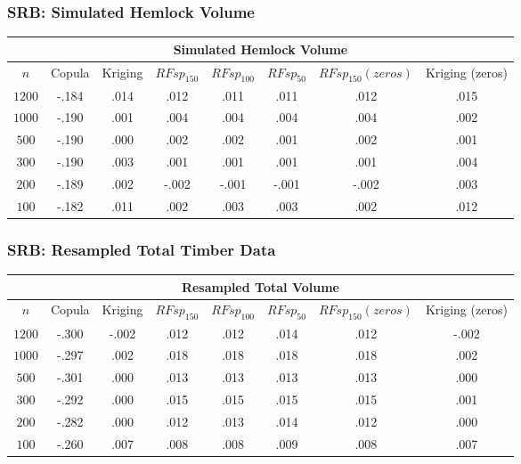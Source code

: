 \documentclass{beamer}
\begin{document}
\begin{frame}
	\frametitle{SRB: Simulated Hemlock Volume}
	\begin{center}
		\begin{tabular}{|| c | c c c c c c c ||}
		\hline
		\multicolumn{8}{||c||}{Simulated Hemlock Volume} \\
		\hline
		$n$ & Copula & Kriging & $RFsp_{150}$ & $RFsp_{100}$ & $RFsp_{50}$ & $RFsp_{150}(zeros)$ & Kriging (zeros) \\ [.5ex] 
		\hline\hline
		$1200$ & \cellcolor{gray}-.184 & .014 & .012 & \cellcolor{cyan}.011 & \cellcolor{cyan}.011 & .012 & .015 \\
		$1000$ & \cellcolor{gray}-.190 & \cellcolor{cyan}.001 & .004 & .004 & .004 & .004 & .002 \\
		$500$ & \cellcolor{gray}-.190 & \cellcolor{cyan}.000 & .002 & .002 & .001 & .002 & .001 \\
		$300$ & \cellcolor{gray}-.190 & .003 & \cellcolor{cyan}.001 & \cellcolor{cyan}.001 & \cellcolor{cyan}.001 & \cellcolor{cyan}.001 & .004 \\
		$200$ & \cellcolor{gray}-.189 & .002 & -.002 & \cellcolor{cyan}-.001 & \cellcolor{cyan}-.001 & -.002 & .003 \\
		$100$ & \cellcolor{gray}-.182 & .011 & \cellcolor{cyan}.002 & .003 & .003 & \cellcolor{cyan}.002 & .012 \\ [.5ex] 
		\hline
		\end{tabular}
	\end{center}
\end{frame}

\begin{frame}
	\frametitle{SRB: Resampled Total Timber Data}
	\begin{center}
		\begin{tabular}{|| c | c c c c c c c ||}
		\hline
		\multicolumn{8}{||c||}{Resampled Total Volume} \\
		\hline
		$n$ & Copula & Kriging & $RFsp_{150}$ & $RFsp_{100}$ & $RFsp_{50}$ & $RFsp_{150}(zeros)$ & Kriging (zeros) \\ [.5ex] 
		\hline\hline
		$1200$ & \cellcolor{gray}-.300 & \cellcolor{cyan}-.002 & .012 & .012 & .014 & .012 & \cellcolor{cyan}-.002 \\
		$1000$ & \cellcolor{gray}-.297 & \cellcolor{cyan}.002 & .018 & .018 & .018 & .018 & \cellcolor{cyan}.002 \\
		$500$ & \cellcolor{gray}-.301 & \cellcolor{cyan}.000 & .013 & .013 & .013 & .013 & \cellcolor{cyan}.000 \\
		$300$ & \cellcolor{gray}-.292 & \cellcolor{cyan}.000 & .015 & .015 & .015 & .015 & .001 \\
		$200$ & \cellcolor{gray}-.282 & \cellcolor{cyan}.000 & .012 & .013 & .014 & .012 & \cellcolor{cyan}.000 \\
		$100$ & \cellcolor{gray}-.260 & \cellcolor{cyan}.007 & .008 & .008 & .009 & .008 & \cellcolor{cyan}.007 \\ [.5ex] 
		\hline
		\end{tabular}
	\end{center}
\end{frame}
\end{document}
